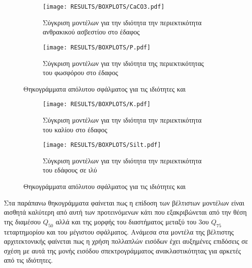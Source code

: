 \begin{figure}[H]
    \begin{subfigure}{0.5\textwidth}
        \texttt{[image: RESULTS/BOXPLOTS/CaCO3.pdf]}
        \caption{Σύγκριση μοντέλων για την ιδιότητα την περιεκτικότητα ανθρακικού ασβεστίου στο έδαφος}
        \label{fig:CaCO3_boxplot}
    \end{subfigure}
    \begin{subfigure}{0.5\textwidth}
        \texttt{[image: RESULTS/BOXPLOTS/P.pdf]}
        \caption{Σύγκριση μοντέλων για την ιδιότητα της περιεκτικότητας του φωσφόρου στο έδαφος}
        \label{fig:P_boxplot}
    \end{subfigure}
    \caption{Θηκογράμματα απόλυτου σφάλματος για τις ιδιότητες  και }
\end{figure}
\begin{figure}[H]
    \begin{subfigure}{0.5\textwidth}
        \texttt{[image: RESULTS/BOXPLOTS/K.pdf]}
        \caption{Σύγκριση μοντέλων για την ιδιότητα την περιεκτικότητα του καλίου στο έδαφος}
        \label{fig:K_boxplot}
    \end{subfigure}
    \begin{subfigure}{0.5\textwidth}
        \texttt{[image: RESULTS/BOXPLOTS/Silt.pdf]}
        \caption{Σύγκριση μοντέλων για την ιδιότητα την περιεκτικότητα του εδάφους σε ιλύ}
        \label{fig:Silt_boxplot}
    \end{subfigure}
    \caption{Θηκογράμματα απόλυτου σφάλματος για τις ιδιότητες  και }
\end{figure}

Στα παράπανω θηκογράμματα φαίνεται πως η επίδοση των βέλτιστων μοντέλων είναι αισθητά καλύτερη από αυτή των προτεινόμενων κάτι που εξακριβώνεται από την θέση της διαμέσου $Q_{50}$ αλλά και της μορφής του διαστήματος μεταξύ του 3ου $Q_{75}$ τεταρτημορίου και του μέγιστου σφάλματος. Ανάμεσα στα μοντέλα της βέλτιστης αρχιτεκτονικής φαίνεται πως η χρήση πολλαπλών εισόδων έχει αυξημένες επιδόσεις σε σχέση με αυτά της μονής εισόδου σπεκτρογράμματος ανακλαστικότητας για αρκετές από τις ιδιότητες.

